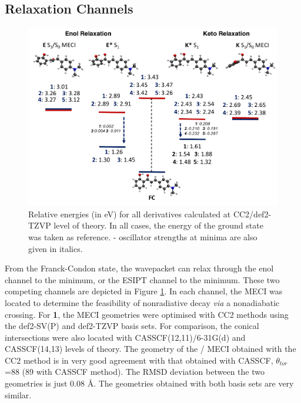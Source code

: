 \subsection{Relaxation Channels}\label{section: NRdecay_Channels}
\begin{figure}
\centering
  \includegraphics[width=0.9\linewidth]{3nonradiativedecay/HC_Energy_Levels.pdf}
  \caption[\textbf{HC} energy levels]{Relative energies (in eV) for all derivatives calculated at CC2/def2-TZVP level of theory. In all cases, the energy of the ground state was taken as reference. \sone{}-\szero{} oscillator strengths at \sone{} minima are also given in italics.}
  \label{figure: HC_Energy_Levels}
\end{figure}
From the Franck-Condon state, the wavepacket can relax through the enol channel to the \Estar{} minimum, or the ESIPT channel to the \Kstar{} minimum. These two competing channels are depicted in Figure \ref{figure: HC_Energy_Levels}. In each channel, the \ac{MECI} was located to determine the feasibility of nonradiative decay \textit{via} a nonadiabatic crossing. For \textbf{1}, the \ac{MECI} geometries were optimised with CC2 methods using the def2-SV(P) and def2-TZVP basis sets. For comparison, the conical intersections were also located with CASSCF(12,11)/6-31G(d) and CASSCF(14,13) levels of theory. The geometry of the \Kstar{} \sone/\szero{} \ac{MECI} obtained with the CC2 method is in very good agreement with that obtained with CASSCF, $\theta_{tor}$=88\textdegree{} (89\textdegree{} with CASSCF method). The \ac{RMSD} deviation between the two geometries is just 0.08 \AA. The geometries obtained with both basis sets are very similar. 

